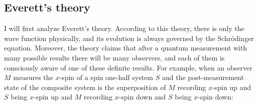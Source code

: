 



\subsection{Everett's theory} %

I will first analyze Everett's theory. According to this theory, there is only the wave function physically, and its evolution is always governed by the Schr\"{o}dinger equation.
Moreover, the theory claims that after a quantum measurement with many possible results there will be many observers, and each of them is consciously aware of one of these definite results.
For example, when an observer $M$ measures the $x$-spin of a spin one-half system $S$ and the post-measurement state of the composite system is the superposition of $M$ recording $x$-spin up and $S$ being $x$-spin up and $M$ recording $x$-spin down and $S$ being $x$-spin down:

